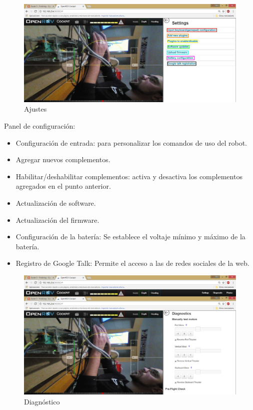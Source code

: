 \begin{figure} [hbtp]
\begin{center}
  \includegraphics[width=15cm]{img/cap3/3_5/setting}
\end{center}
\caption{Ajustes}
\label{fig:settting}
\end{figure}
\newpage
Panel de configuración:
\begin{itemize}
 \item[\textcolor{red}{\textbullet}] Configuración de entrada: para personalizar los comandos de uso del robot.
 \item[\textcolor{orange}{\textbullet}] Agregar nuevos complementos.
 \item[\textcolor{yellow}{\textbullet}] Habilitar/deshabilitar complementos: activa y desactiva los complementos agregados en el punto anterior.
 \item[\textcolor{green}{\textbullet}] Actualización de software.
 \item[\textcolor{blue}{\textbullet}] Actualización del firmware.
 \item[\textcolor{purple}{\textbullet}] Configuración de la batería: Se establece el voltaje mínimo y máximo de la batería.
 \item[\textcolor{black}{\textbullet}] Registro de Google Talk: Permite el acceso a las de redes sociales de la web.
 \end{itemize}

\begin{figure} [hbtp]
\begin{center}
  \includegraphics[width=15cm]{img/cap3/3_5/diagnostico}
\end{center}
\caption{Diagnóstico}
\label{fig:diagnostico}
\end{figure}

